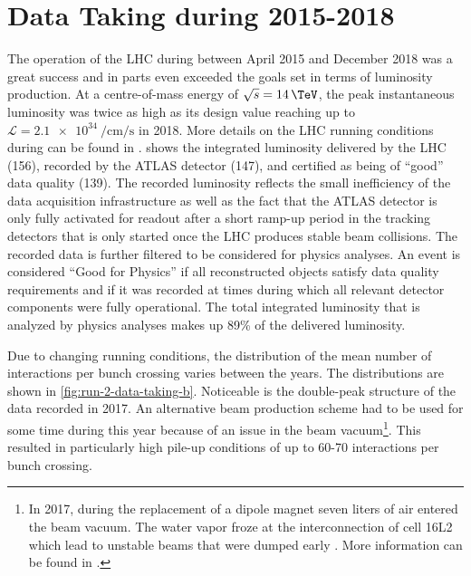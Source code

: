 \section{Data Taking during 2015-2018}
\label{sec:run-2-data-taking}

The operation of the LHC during \RunTwo between April 2015 and December 2018 was a great success and in parts even exceeded the goals set in terms of luminosity production. At a centre-of-mass energy of $\sqrt{s} = 14\,\TeV$, the peak instantaneous luminosity was twice as high as its design value reaching up to $\mathcal{L} = \SI{2.1e34}{\per\cm\per\s}$ in 2018. More details on the LHC running conditions during \RunTwo can be found in .
 shows the integrated luminosity delivered by the LHC (156\ifb), recorded by the ATLAS detector (147\ifb), and certified as being of ``good'' data quality (139\ifb).
The recorded luminosity reflects the small inefficiency of the data acquisition infrastructure as well as the fact that the ATLAS detector is only fully activated for readout after a short ramp-up period in the tracking detectors that is only started once the LHC produces stable beam collisions.
The recorded data is further filtered to be considered for physics analyses.
An event is considered ``Good for Physics'' if all reconstructed objects satisfy data quality requirements and if it was recorded at times during which all relevant detector components were fully operational.
The total integrated luminosity that is analyzed by physics analyses makes up 89\% of the delivered luminosity. 

Due to changing running conditions, the distribution of the mean number of interactions per bunch crossing varies between the years. 
The distributions are shown in \cref{fig:run-2-data-taking-b}. 
Noticeable is the double-peak structure of the data recorded in 2017. 
An alternative beam production scheme had to be used for some time during this year because of an issue in the beam vacuum\footnote{In 2017, during the replacement of a dipole magnet seven liters of air entered the beam vacuum. The water vapor froze at the interconnection of cell 16L2 which lead to unstable beams that were dumped early \cite{Jimenez:2646067,Salvant:2646056}. More information can be found in .}. This resulted in particularly high pile-up conditions of up to 60-70 interactions per bunch crossing. 


